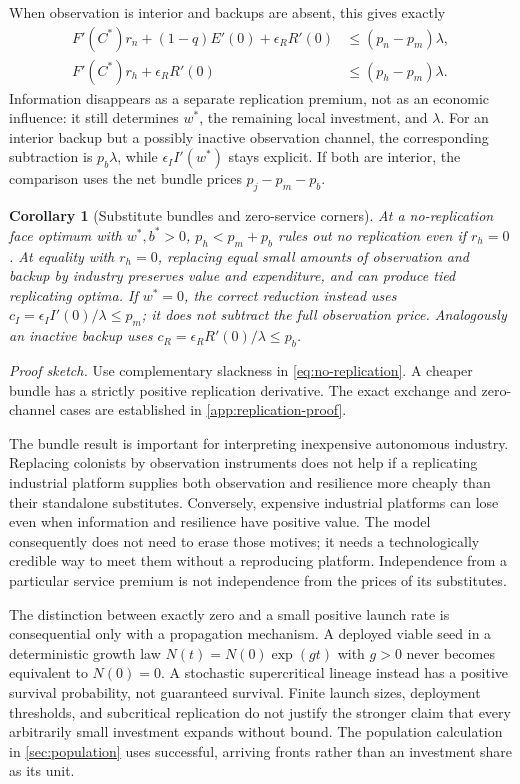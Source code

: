 \documentclass[11pt,a4paper]{article}
\newtheorem{corollary}[proposition]{Corollary}
\theoremstyle{definition}\newtheorem{definition}{Definition}
\begin{document}
When observation is interior and backups are absent, this gives exactly
\begin{align}
 F'(C^*)r_n+(1-q)E'(0)+\epsilon_RR'(0)&\leq(p_n-p_m)\lambda,\nonumber\\
 F'(C^*)r_h+\epsilon_RR'(0)&\leq(p_h-p_m)\lambda.
 \label{eq:observation-net}
\end{align}
Information disappears as a separate replication premium, not as an
economic influence: it still determines $w^*$, the remaining local
investment, and $\lambda$. For an interior backup but a possibly inactive
observation channel, the corresponding subtraction is $p_b\lambda$, while
$\epsilon_II'(w^*)$ stays explicit. If both are interior, the comparison
uses the net bundle prices $p_j-p_m-p_b$.

\begin{corollary}[Substitute bundles and zero-service corners]
\label{cor:bundle}
At a no-replication face optimum with $w^*,b^*>0$, $p_h<p_m+p_b$
rules out no replication even if $r_h=0$. At equality with $r_h=0$,
replacing equal small amounts of observation and backup by industry
preserves value and expenditure, and can produce tied replicating optima.
If $w^*=0$, the correct reduction instead uses
$c_I=\epsilon_II'(0)/\lambda\leq p_m$; it does not subtract the full
observation price. Analogously an inactive backup uses
$c_R=\epsilon_RR'(0)/\lambda\leq p_b$.
\end{corollary}
\noindent\emph{Proof sketch.}
Use complementary slackness in \cref{eq:no-replication}. A cheaper bundle
has a strictly positive replication derivative. The exact exchange and
zero-channel cases are established in \cref{app:replication-proof}.

The bundle result is important for interpreting inexpensive autonomous
industry. Replacing colonists by observation instruments does not help
if a replicating industrial platform supplies both observation and
resilience more cheaply than their standalone substitutes. Conversely,
expensive industrial platforms can lose even when information and
resilience have positive value. The model consequently does not need
to erase those motives; it needs a technologically credible way to meet
them without a reproducing platform. Independence from a particular
service premium is not independence from the prices of its substitutes.

The distinction between exactly zero and a small positive launch rate
is consequential only with a propagation mechanism. A deployed viable
seed in a deterministic growth law $N(t)=N(0)\exp(g t)$ with $g>0$ never
becomes equivalent to $N(0)=0$. A stochastic supercritical lineage instead
has a positive survival probability, not guaranteed survival. Finite
launch sizes, deployment thresholds, and subcritical replication do not
justify the stronger claim that every arbitrarily small investment expands
without bound. The population calculation in \cref{sec:population} uses
successful, arriving fronts rather than an investment share as its unit.
\end{document}
